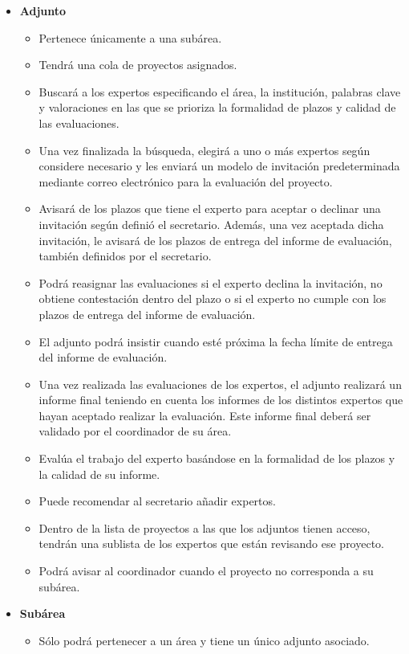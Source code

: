 \documentclass[12pt,a4paper,spanish,twoside]{article}
\begin{document}
\begin{itemize}
\item \textbf{Adjunto}
\begin{itemize}
\item Pertenece únicamente a una subárea.
\item Tendrá una cola de proyectos asignados.
\item Buscará a los expertos especificando el área, la institución, palabras clave y valoraciones 
en las que se prioriza la formalidad de plazos y calidad de las evaluaciones.
\item Una vez finalizada la búsqueda, elegirá a uno o más expertos según considere necesario y les enviará 
un modelo de invitación predeterminada mediante correo electrónico para la  evaluación del proyecto. 
\item Avisará de los plazos que tiene el experto para aceptar o declinar una invitación según definió el 
secretario. Además, una vez aceptada dicha invitación, le avisará de los plazos de entrega del informe 
de evaluación, también definidos por el secretario.
\item Podrá reasignar las evaluaciones si el experto declina la invitación, no obtiene contestación dentro 
del plazo o si el experto no cumple con los plazos de entrega del informe de evaluación.
\item El adjunto podrá insistir cuando esté próxima la fecha límite de entrega del informe de evaluación.
\item Una vez realizada las evaluaciones de los expertos, el adjunto realizará un informe final teniendo en cuenta 
los informes de los distintos expertos que hayan aceptado realizar la evaluación. Este informe final deberá ser 
validado por el coordinador de su área.
\item Evalúa el trabajo del experto basándose en la formalidad de los plazos y la calidad de su informe.
\item Puede recomendar al secretario añadir expertos.
\item Dentro de la lista de proyectos a las que los adjuntos tienen acceso, tendrán una sublista de los expertos 
que están revisando ese proyecto.
\item Podrá avisar al coordinador cuando el proyecto no corresponda a su subárea.
\end{itemize}

\item \textbf{Subárea}
\begin{itemize}
\item Sólo podrá pertenecer a un área y tiene un único adjunto asociado.
\end{itemize}


\end{itemize}
\end{document}
